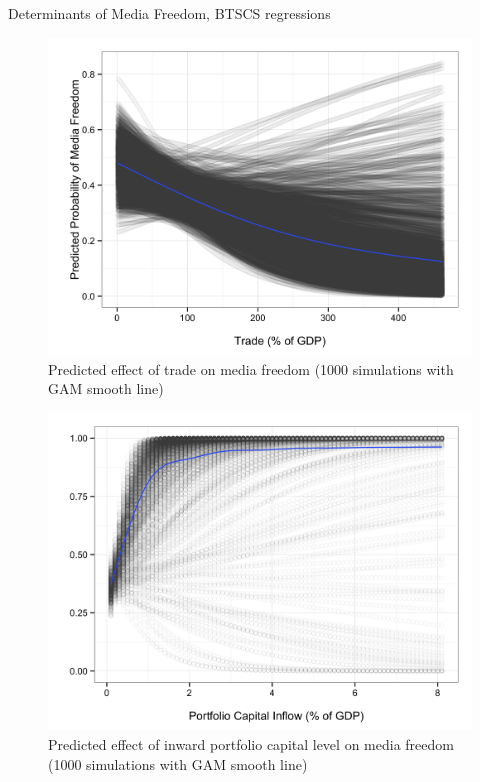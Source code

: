 \documentclass[12pt]{report}
\begin{document}
\begin{centering}

\begin{table}

\caption{Determinants of Media Freedom, BTSCS regressions}
\end{table}

\begin{figure}
\includegraphics[scale=0.2]{article2_trade_effect_plot.png}
\caption{Predicted effect of trade on media freedom (1000 simulations with GAM smooth line)}
\end{figure}

\begin{figure}
\includegraphics[scale=0.2]{article2_portfolio_effect_plot.png}
\caption{Predicted effect of inward portfolio capital level on media freedom (1000 simulations with
GAM smooth line)}
\end{figure}


\end{centering}
\end{document}
